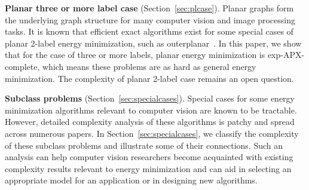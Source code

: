 \textbf{Planar three or more label case}  (Section~\ref{sec:plcase}). Planar graphs form the underlying graph structure for many computer vision and image processing tasks. It is known that efficient exact algorithms exist for some special cases of planar 2-label energy minimization, such as outerplanar~\cite{Schraudolph-10}.  In this paper, we show that for the case of three or more labels, planar energy minimization is exp-APX-complete, which means these problems are as hard as general energy minimization. The complexity of planar 2-label case remains an open question.

\textbf{Subclass problems}  (Section~\ref{sec:specialcases}). Special cases for some energy minimization algorithms relevant to computer vision are known to be tractable. However, detailed complexity analysis of these algorithms is patchy and spread across numerous papers.  In Section~\ref{sec:specialcases}, we classify the complexity of these subclass problems and illustrate some of their connections.  Such an analysis can help computer vision researchers become acquainted with existing complexity results relevant to energy minimization and can aid in selecting an appropriate model for an application or in designing new algorithms.






